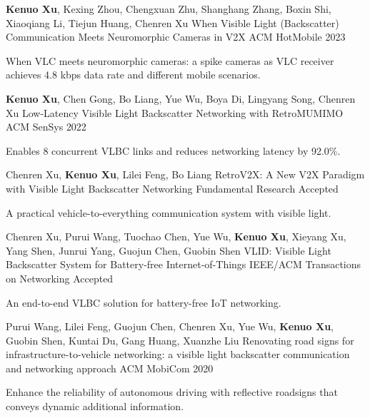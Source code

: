 \documentclass[11pt, a4paper]{awesome-cv}
\begin{document}
\begin{cventries}
	
	\cventry
	{\textbf{Kenuo Xu}, Kexing Zhou, Chengxuan Zhu, Shanghang Zhang, Boxin Shi, Xiaoqiang Li, Tiejun Huang, Chenren Xu}
	{When Visible Light (Backscatter) Communication Meets Neuromorphic Cameras in V2X}
	{ACM HotMobile}
	{2023}
	{
		\begin{cvitems} %
			\item {When VLC meets neuromorphic cameras: a spike cameras as VLC receiver achieves 4.8 kbps data rate and different mobile scenarios.}
		\end{cvitems}
	}

	\cventry
	{\textbf{Kenuo Xu}, Chen Gong, Bo Liang, Yue Wu, Boya Di, Lingyang Song, Chenren Xu}
	{Low-Latency Visible Light Backscatter Networking with RetroMUMIMO}
	{ACM SenSys}
	{2022}
	{
		\begin{cvitems} %
			\item {Enables 8 concurrent VLBC links and reduces networking latency by 92.0\%.}
		\end{cvitems}
	}

	\cventry
	{Chenren Xu, \textbf{Kenuo Xu}, Lilei Feng, Bo Liang}
	{RetroV2X: A New V2X Paradigm with Visible Light Backscatter Networking}
	{Fundamental Research}
	{Accepted}
	{
		\begin{cvitems} %
			\item {A practical vehicle-to-everything communication system with visible light.}
		\end{cvitems}
	}
	
	\cventry
	{Chenren Xu, Purui Wang, Tuochao Chen, Yue Wu, \textbf{Kenuo Xu}, Xieyang Xu, Yang Shen, Junrui Yang, Guojun Chen, Guobin Shen}
	{VLID: Visible Light Backscatter System for Battery-free Internet-of-Things}
	{IEEE/ACM Transactions on Networking}
	{Accepted}
	{
		\begin{cvitems} %
			\item {An end-to-end VLBC solution for battery-free IoT networking.}
		\end{cvitems}
	}
	
	\cventry
	{Purui Wang, Lilei Feng, Guojun Chen, Chenren Xu, Yue Wu, \textbf{Kenuo Xu}, Guobin Shen, Kuntai Du, Gang Huang, Xuanzhe Liu}
	{Renovating road signs for infrastructure-to-vehicle networking: a visible light backscatter communication and networking approach}
	{ACM MobiCom}
	{2020}
	{
		\begin{cvitems} %
			\item {Enhance the reliability of autonomous driving with reflective roadsigns that conveys dynamic additional information.}
		\end{cvitems}
	}
	

\end{cventries}
\end{document}
